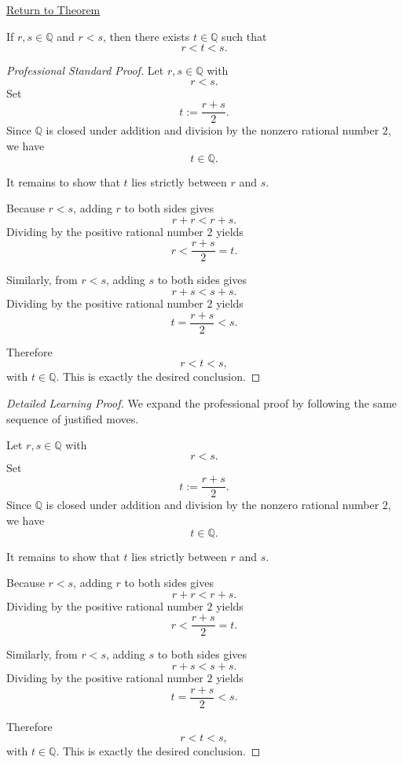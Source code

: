 \newpage
{}
\label{prf:between-any-two-rationals-is-a-rational}

\begin{remark*}[Return]
\hyperref[thm:between-any-two-rationals-is-a-rational]{Return to Theorem}
\end{remark*}

\begin{theorem*}
If $r,s\in\mathbb{Q}$ and $r<s$, then there exists $t\in\mathbb{Q}$ such that
\[
r<t<s.
\]
\end{theorem*}

\begin{proof}[Professional Standard Proof]
\LRAProofBodyStart
Let $r,s\in\mathbb{Q}$ with
\[
r<s.
\]
Set
\[
t:=\frac{r+s}{2}.
\]
Since $\mathbb{Q}$ is closed under addition and division by the nonzero
rational number $2$, we have
\[
t\in\mathbb{Q}.
\]

It remains to show that $t$ lies strictly between $r$ and $s$.

Because $r<s$, adding $r$ to both sides gives
\[
r+r<r+s.
\]
Dividing by the positive rational number $2$ yields
\[
r<\frac{r+s}{2}=t.
\]

Similarly, from $r<s$, adding $s$ to both sides gives
\[
r+s<s+s.
\]
Dividing by the positive rational number $2$ yields
\[
t=\frac{r+s}{2}<s.
\]

Therefore
\[
r<t<s,
\]
with $t\in\mathbb{Q}$.  This is exactly the desired conclusion.
\end{proof}

\begin{proof}[Detailed Learning Proof]
\LRAProofBodyStart
We expand the professional proof by following the same sequence of justified moves.

Let $r,s\in\mathbb{Q}$ with
\[
r<s.
\]
Set
\[
t:=\frac{r+s}{2}.
\]
Since $\mathbb{Q}$ is closed under addition and division by the nonzero
rational number $2$, we have
\[
t\in\mathbb{Q}.
\]

It remains to show that $t$ lies strictly between $r$ and $s$.

Because $r<s$, adding $r$ to both sides gives
\[
r+r<r+s.
\]
Dividing by the positive rational number $2$ yields
\[
r<\frac{r+s}{2}=t.
\]

Similarly, from $r<s$, adding $s$ to both sides gives
\[
r+s<s+s.
\]
Dividing by the positive rational number $2$ yields
\[
t=\frac{r+s}{2}<s.
\]

Therefore
\[
r<t<s,
\]
with $t\in\mathbb{Q}$.  This is exactly the desired conclusion.
\end{proof}

